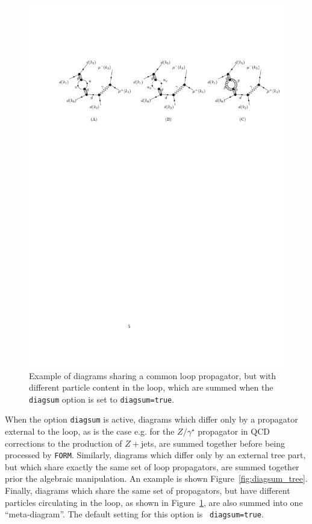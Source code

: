 \documentclass[11pt,a4paper]{refrep}
\newcommand{\form}{{\tt FORM}\xspace}
\begin{document}
\begin{figure}[htb]
\centering
\includegraphics[width=1.1\textwidth]{diagsum2.pdf}
\caption{Example of diagrams sharing a common loop propagator, 
but with different particle content in the loop, which are summed when
the {\tt diagsum} option is set to {\tt diagsum=true}.}
\label{fig:diagsum_particle}
\end{figure} 


When the option {\tt diagsum} is active, diagrams which differ only by
a propagator external to the loop, as is the case e.g. for the
$Z/\gamma^\star$ propagator in QCD corrections to the production of
$Z+$jets, are summed together before being processed
by \form{}. Similarly, diagrams which differ only by an external tree
part, but which share exactly the same set of loop propagators, are
summed together prior the algebraic manipulation. An example is shown
Figure~\ref{fig:diagsum_tree}. Finally, diagrams which share the same
set of propagators, but have different particles circulating in the
loop, as shown in Figure~\ref{fig:diagsum_particle}, are also summed
into one ``meta-diagram''. The default setting for this option is {\tt
diagsum=true}.
\end{document}
